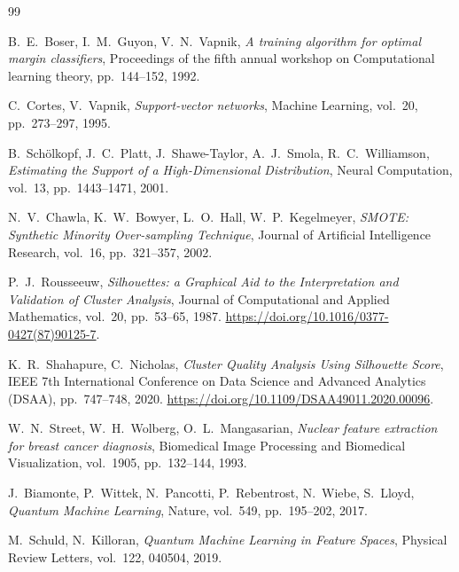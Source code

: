 \documentclass[a4paper]{article}
\begin{document}
\begin{thebibliography}{99}


 B.~E.~Boser, I.~M.~Guyon, V.~N.~Vapnik, \textit{A training algorithm for optimal margin classifiers}, Proceedings of the fifth annual workshop on Computational learning theory, pp.~144--152, 1992.

 C.~Cortes, V.~Vapnik, \textit{Support-vector networks}, Machine Learning, vol.~20, pp.~273--297, 1995.

 B.~Schölkopf, J.~C.~Platt, J.~Shawe-Taylor, A.~J.~Smola, R.~C.~Williamson, \textit{Estimating the Support of a High-Dimensional Distribution}, Neural Computation, vol.~13, pp.~1443--1471, 2001.

 N.~V.~Chawla, K.~W.~Bowyer, L.~O.~Hall, W.~P.~Kegelmeyer, \textit{SMOTE: Synthetic Minority Over-sampling Technique}, Journal of Artificial Intelligence Research, vol.~16, pp.~321--357, 2002.

 P.~J.~Rousseeuw, \textit{Silhouettes: a Graphical Aid to the Interpretation and Validation of Cluster Analysis}, Journal of Computational and Applied Mathematics, vol.~20, pp.~53--65, 1987. \url{https://doi.org/10.1016/0377-0427(87)90125-7}.

 K.~R.~Shahapure, C.~Nicholas, \textit{Cluster Quality Analysis Using Silhouette Score}, IEEE 7th International Conference on Data Science and Advanced Analytics (DSAA), pp.~747--748, 2020. \url{https://doi.org/10.1109/DSAA49011.2020.00096}.

 W.~N.~Street, W.~H.~Wolberg, O.~L.~Mangasarian, \textit{Nuclear feature extraction for breast cancer diagnosis}, Biomedical Image Processing and Biomedical Visualization, vol.~1905, pp.~132--144, 1993.


 J.~Biamonte, P.~Wittek, N.~Pancotti, P.~Rebentrost, N.~Wiebe, S.~Lloyd, \textit{Quantum Machine Learning}, Nature, vol.~549, pp.~195--202, 2017.

 M.~Schuld, N.~Killoran, \textit{Quantum Machine Learning in Feature Spaces}, Physical Review Letters, vol.~122, 040504, 2019.


\end{thebibliography}
\end{document}
